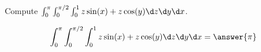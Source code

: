\documentclass{ximera}
\author{David Guichard \and Neal Koblitz \and H. Jerome Keisler \and Albert Scheller \and Barry Balof \and Mike Wills \and Matthew Carr}
\begin{document}
\begin{exercise}





Compute $\int_{0}^{\pi}\int_{0}^{\pi/2}\int_{0}^{1}z\sin(x)+z\cos(y) \d z\d y\d x$.

\begin{prompt}
\[
\int_{0}^{\pi}\int_{0}^{\pi/2}\int_{0}^{1}z\sin(x)+z\cos(y) \d z\d y\d x=\answer{\pi}
\]
\end{prompt}



\end{exercise}
\end{document}
